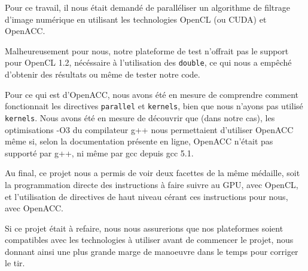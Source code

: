 \documentclass[11pt]{report}
\begin{document}
	Pour ce travail, il nous était demandé de paralléliser un algorithme de filtrage d'image numérique en utilisant les technologies OpenCL (ou CUDA) et OpenACC.

	\bigskip
	Malheureusement pour nous, notre plateforme de test n'offrait pas le support pour OpenCL 1.2, nécéssaire à l'utilisation des \texttt{double}, ce qui nous a empêché d'obtenir des résultats ou même de tester notre code.

	\bigskip
	Pour ce qui est d'OpenACC, nous avons été en mesure de comprendre comment fonctionnait les directives \texttt{parallel} et \texttt{kernels}, bien que nous n'ayons pas utilisé \texttt{kernels}. Nous avons été en mesure de découvrir que (dans notre cas), les optimisations -O3 du compilateur g++ nous permettaient d'utiliser OpenACC même si, selon la documentation présente en ligne, OpenACC n'était pas supporté par g++, ni même par gcc depuis gcc 5.1.
	
	\bigskip
	Au final, ce projet nous a permis de voir deux facettes de la même médaille, soit la programmation directe des instructions à faire suivre au GPU, avec OpenCL, et l'utilisation de directives de haut niveau cérant ces instructions pour nous, avec OpenACC.

	\bigskip
	Si ce projet était à refaire, nous nous assurerions que nos plateformes soient compatibles avec les technologies à utiliser avant de commencer le projet, nous donnant ainsi une plus grande marge de manoeuvre dans le temps pour corriger le tir.
	
\end{document}
